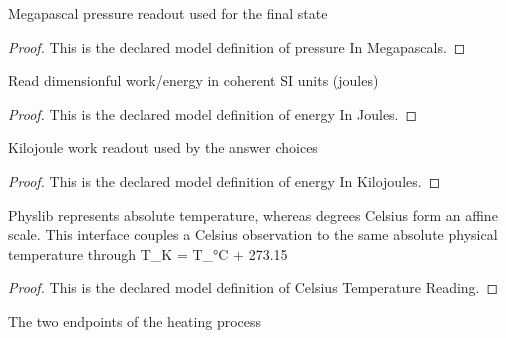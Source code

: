 \begin{definition}
  \label{def:physics:phyx-mini-0450:phyxminiproblems-problemphyxmini0450-pressureinmegapascals}
  Megapascal pressure readout used for the final state
\end{definition}
\begin{proof}
  This is the declared model definition of pressure In Megapascals.
\end{proof}
\begin{definition}
  \label{def:physics:phyx-mini-0450:phyxminiproblems-problemphyxmini0450-energyinjoules}
  Read dimensionful work/energy in coherent SI units (joules)
\end{definition}
\begin{proof}
  This is the declared model definition of energy In Joules.
\end{proof}
\begin{definition}
  \label{def:physics:phyx-mini-0450:phyxminiproblems-problemphyxmini0450-energyinkilojoules}
  Kilojoule work readout used by the answer choices
\end{definition}
\begin{proof}
  This is the declared model definition of energy In Kilojoules.
\end{proof}
\begin{definition}
  \label{def:physics:phyx-mini-0450:phyxminiproblems-problemphyxmini0450-celsiustemperaturereading}
  Physlib represents absolute temperature, whereas degrees Celsius form an affine scale. This interface couples a Celsius observation to the same absolute physical temperature through T\_K = T\_°C + 273.15
\end{definition}
\begin{proof}
  This is the declared model definition of Celsius Temperature Reading.
\end{proof}
\begin{definition}
  \label{def:physics:phyx-mini-0450:phyxminiproblems-problemphyxmini0450-processendpoint}
  The two endpoints of the heating process
\end{definition}
